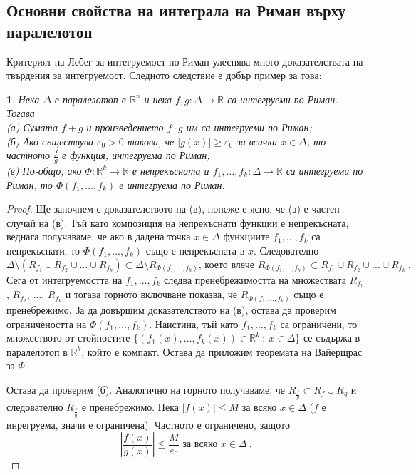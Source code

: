 \documentclass[11pt]{article}
\numberwithin{equation}{section}
\numberwithin{figure}{section}
\numberwithin{table}{section}
\theoremstyle{plain}
\theoremstyle{definition}
\theoremstyle{remark}
\theoremstyle{definition}
\theoremstyle{remark}
\theoremstyle{plain}
\theoremstyle{definition}
\theoremstyle{definition}
\theoremstyle{plain}
\newtheorem{cor}[thm]{\protect\corollaryname}
\theoremstyle{plain}
\theoremstyle{plain}
\theoremstyle{definition}
\theoremstyle{plain}
\providecommand{\corollaryname}{Следствие}
\newcommand*{\R}{\mathbb{R}}
\begin{document}
\subsection{Основни свойства на интеграла на Риман върху паралелотоп}

Критерият на Лебег за интегруемост по Риман улеснява много доказателствата на твърдения за интегруемост. Следното следствие е добър пример за това:

\begin{cor}\label{stability}
Нека $\Delta$ е паралелотоп в $\R^n$ и нека $f, g: \Delta \longrightarrow \R$ са интегруеми по Риман. Тогава
\\
(а) Сумата $f+g$ и произведението $f\cdot g$ им са интегруеми по Риман;
\\
(б) Ако съществува $\varepsilon_0 >0$ такова, че $|g(x)|\geq \varepsilon_0$ за всички $x \in \Delta$, то частното $\frac{f}{g}$ е функция, интегруема по Риман;
\\
(в) По-общо, ако $\Phi :\R^k \longrightarrow \R$  е непрекъсната и $f_1, \dots , f_k:\Delta \longrightarrow \R$ са интегруеми по Риман, то $\Phi (f_1,\dots ,f_k)$ е интегруема по Риман.
\end{cor}

\begin{proof}
Ще започнем с доказателството на (в), понеже е ясно, че (а) е частен случай на (в). Тъй като композиция на непрекъснати функции е непрекъсната, веднага получаваме, че ако в дадена точка $x\in \Delta$ функциите $f_1, \dots , f_k$ са непрекъснати, то $\Phi (f_1,\dots ,f_k)$ също е непрекъсната в $x$. Следователно
$$\Delta\setminus \left( R_{f_1}\cup R_{f_2}\cup \dots \cup R_{f_k}\right)\subset \Delta\setminus R_{\Phi (f_1,\dots ,f_k)} \mbox{, което влече } R_{\Phi (f_1,\dots ,f_k)}\subset R_{f_1}\cup R_{f_2}\cup \dots \cup R_{f_k} \ .$$
Сега от интегруемостта на $f_1, \dots , f_k$ следва пренебрежимостта на множествата $R_{f_1}$, $R_{f_2}$, $\dots$, $R_{f_k}$ и тогава горното включване показва, че $R_{\Phi (f_1,\dots ,f_k)}$ също е пренебрежимо. За да довършим доказателството на (в), остава да проверим ограничеността на $\Phi (f_1,\dots ,f_k)$. Наистина, тъй като $f_1, \dots , f_k$ са ограничени, то множеството от стойностите
$\{ (f_1(x), \dots , f_k(x))\in \R^k \ : \ x\in \Delta\}$ се съдържа в паралелотоп в $\R^k$, който е компакт. Остава да приложим теоремата на Вайерщрас за $\Phi$.

Остава да проверим (б). Аналогично на горното получаваме, че $R_{\frac{f}{g}}\subset R_{f}\cup R_{g}$ и следователно $R_{\frac{f}{g}}$ е пренебрежимо. Нека $|f(x)|\le M$ за всяко $x\in \Delta$ ($f$ е инрегруема, значи е ограничена). Частното е ограничено, защото
$$\left| \frac{f(x)}{g(x)}\right| \le \frac{M}{\varepsilon_0} \mbox{ за всяко } x\in \Delta \ .$$
\end{proof}
\end{document}
